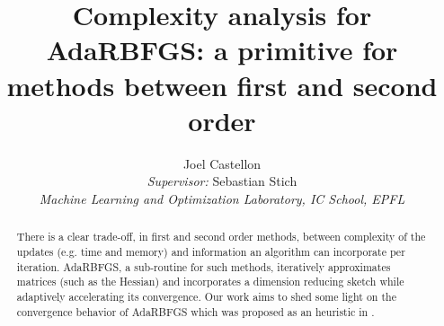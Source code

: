 \documentclass[12pt,conference,compsocconf]{IEEEtran}
\begin{document}
\renewcommand{\arraystretch}{1.2}

\title{Complexity analysis for AdaRBFGS: a primitive for methods between first and second order}

\author{
  Joel Castellon\\
  \textit{Supervisor:} Sebastian Stich\\
  \vspace{4mm}
  \textit{Machine Learning and Optimization Laboratory, IC School, EPFL}\\
}


\maketitle
\begin{abstract}
There is a clear trade-off, in first and second order methods, between complexity of the updates (e.g. time and memory) and information an algorithm can incorporate per iteration. AdaRBFGS, a sub-routine for such methods, iteratively approximates matrices (such as the Hessian) and incorporates a dimension reducing sketch while adaptively accelerating its convergence. Our work aims to shed some light on the convergence behavior of AdaRBFGS which was proposed as an heuristic in \cite{Gower1}.
\end{abstract}
\end{document}
